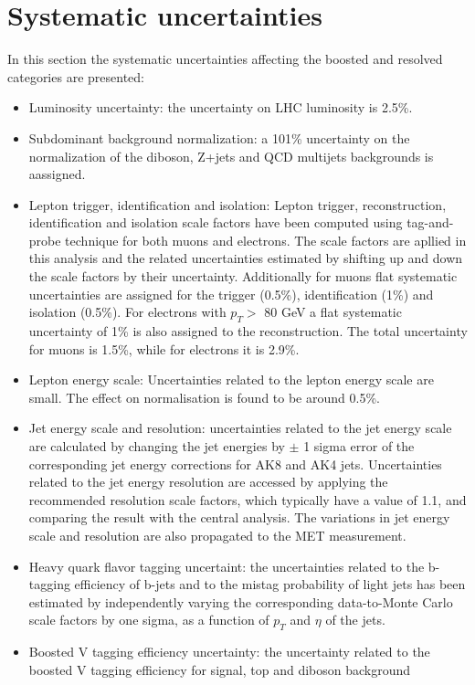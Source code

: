\section{Systematic uncertainties}
In this section the systematic uncertainties affecting the boosted and resolved categories are
presented:
\begin{itemize}
\item  Luminosity uncertainty:  the uncertainty on LHC luminosity is 2.5\%.
\item Subdominant background normalization: a 101\% uncertainty on the normalization of the diboson, Z+jets and QCD multijets
backgrounds is aassigned.
\item Lepton trigger, identification and isolation: Lepton trigger, reconstruction, identification and isolation scale factors have been computed
using tag-and-probe technique for both muons  and electrons. 
The scale factors are apllied in this analysis and the related uncertainties estimated by shifting up and down
the scale factors by their uncertainty. Additionally for muons flat systematic uncertainties are
assigned for the trigger (0.5\%), identification (1\%) and isolation (0.5\%). 
For electrons with $p_T>$ 80 GeV a flat systematic uncertainty of 1\% is also assigned to the reconstruction. The total
uncertainty for muons is 1.5\%, while for electrons it is 2.9\%.
\item Lepton energy scale: Uncertainties related to the lepton energy scale are small. The effect on normalisation
is found to be around 0.5\%.
\item Jet energy scale and resolution: uncertainties related to the jet energy scale are calculated by changing the jet energies by $\pm$ 1
sigma error of the corresponding jet energy corrections for AK8 and AK4 jets.
Uncertainties related to the jet energy resolution are accessed by applying the recommended
resolution scale factors, which typically have a value of 1.1, and comparing the result with
the central analysis. The variations in jet energy scale and resolution are also propagated to the
MET measurement.
\item Heavy quark flavor tagging uncertaint: the uncertainties related to the b-tagging efficiency of b-jets and to the mistag probability of
light jets has been estimated by independently varying the corresponding data-to-Monte Carlo
scale factors  by one sigma, as a function of $p_T$ and $\eta$ of the jets.
\item Boosted V tagging efficiency uncertainty: the uncertainty related to the boosted V tagging efficiency for signal, top and diboson background 

\end{itemize}
